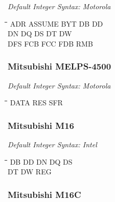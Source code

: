 {\em Default Integer Syntax: Motorola}

{\tt\begin{tabbing}
\hspace{3cm}\=\hspace{3cm}\=\hspace{3cm}\=\hspace{3cm}\=\kill
ADR        \> ASSUME      \> BYT         \> DB          \> DD \\
DN         \> DQ          \> DS          \> DT          \> DW \\
DFS        \> FCB         \> FCC         \> FDB         \> RMB \\
\end{tabbing}}

\subsubsection{Mitsubishi MELPS-4500}

{\em Default Integer Syntax: Motorola}

{\tt\begin{tabbing}
\hspace{3cm}\=\hspace{3cm}\=\hspace{3cm}\=\hspace{3cm}\=\kill
DATA       \> RES         \> SFR \\
\end{tabbing}}

\subsubsection{Mitsubishi M16}

{\em Default Integer Syntax: Intel}

{\tt\begin{tabbing}
\hspace{3cm}\=\hspace{3cm}\=\hspace{3cm}\=\hspace{3cm}\=\kill
DB         \> DD          \> DN          \> DQ          \> DS \\
DT         \> DW          \> REG \\
\end{tabbing}}

\subsubsection{Mitsubishi M16C}

